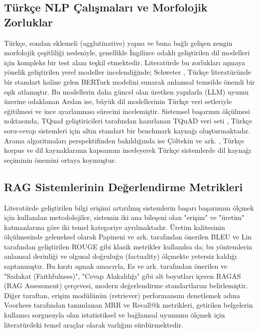 \documentclass[12pt,a4paper]{report}
\begin{document}
\subsection{Türkçe NLP Çalışmaları ve Morfolojik Zorluklar}
Türkçe, sondan eklemeli (agglutinative) yapısı ve buna bağlı gelişen zengin morfolojik çeşitliliği nedeniyle, genellikle İngilizce odaklı geliştirilen dil modelleri için kompleks bir test alanı teşkil etmektedir. Literatürde bu zorlukları aşmaya yönelik geliştirilen yerel modeller incelendiğinde; Schweter \cite{schweter2020berturk}, Türkçe literatüründe bir standart haline gelen BERTurk modelini sunarak anlamsal temsilde önemli bir eşik atlamıştır. Bu modellerin daha güncel olan üretken yapılarla (LLM) uyumu üzerine odaklanan Arslan \cite{arslan2023turkish} ise, büyük dil modellerinin Türkçe veri setleriyle eğitilmesi ve ince ayarlanması sürecini incelemiştir. Sistemsel başarının ölçülmesi noktasında, TQuad geliştiricileri tarafından hazırlanan TQuAD veri seti \cite{acar2020tquad}, Türkçe soru-cevap sistemleri için altın standart bir benchmark kaynağı oluşturmaktadır. Arama algoritmaları perspektifinden bakıldığında ise Çöltekin ve ark. \cite{coltekin2022turkish}, Türkçe korpus ve dil kaynaklarının kapsamını inceleyerek Türkçe sistemlerde dil kaynağı seçiminin önemini ortaya koymuştur.

\subsection{RAG Sistemlerinin Değerlendirme Metrikleri}
Literatürde geliştirilen bilgi erişimi artırılmış sistemlerin başarı başarımını ölçmek için kullanılan metodolojiler, sistemin iki ana bileşeni olan "erişim" ve "üretim" katmanlarına göre iki temel kategoriye ayrılmaktadır. Üretim kalitesinin ölçülmesinde geleneksel olarak Papineni ve ark. \cite{papineni2002bleu} tarafından önerilen BLEU ve Lin \cite{lin2004rouge} tarafından geliştirilen ROUGE gibi klasik metrikler kullanılsa da; bu yöntemlerin anlamsal derinliği ve olgusal doğruluğu (factuality) ölçmekte yetersiz kaldığı saptanmıştır. Bu kısıtı aşmak amacıyla, Es ve ark. \cite{es2023ragas} tarafından önerilen ve "Sadakat (Faithfulness)", "Cevap Alakalılığı" gibi alt boyutları içeren RAGAS (RAG Assessment) çerçevesi, modern değerlendirme standartlarını belirlemiştir. Diğer taraftan, erişim modülünün (retriever) performansını denetlemek adına Voorhees \cite{voorhees1999trec} tarafından tanımlanan MRR ve Recall@k metrikleri, getirilen belgelerin kullanıcı sorgusuyla olan istatistiksel ve bağlamsal uyumunu ölçmek için literatürdeki temel araçlar olarak varlığını sürdürmektedir.
\end{document}
